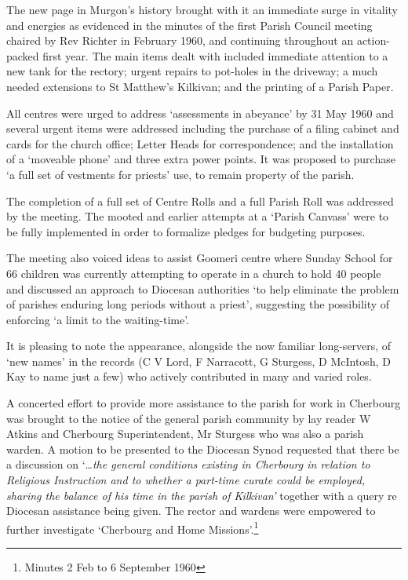 The new page in Murgon's history brought with it an immediate surge in vitality and energies as evidenced in the minutes of the first Parish Council meeting chaired by Rev Richter in February 1960, and continuing throughout an action-packed first year. The main items dealt with included immediate attention to a new tank for the rectory; urgent repairs to pot-holes in the driveway; a much needed extensions to St Matthew's Kilkivan; and the printing of a Parish Paper.

All centres were urged to address `assessments in abeyance' by 31 May 1960 and several urgent items were addressed including the purchase of a filing cabinet and cards for the church office; Letter Heads for correspondence; and the installation of a `moveable phone' and three extra power points. It was proposed to purchase `a full set of vestments for priests' use, to remain property of the parish.

The completion of a full set of Centre Rolls and a full Parish Roll was addressed by the meeting. The mooted and earlier attempts at a `Parish Canvass' were to be fully implemented in order to formalize pledges for budgeting purposes.

The meeting also voiced ideas to assist Goomeri centre where Sunday School for 66 children was currently attempting to operate in a church to hold 40 people and discussed an approach to Diocesan authorities `to help eliminate the problem of parishes enduring long periods without a priest', suggesting the possibility of enforcing `a limit to the waiting-time'.

It is pleasing to note the appearance, alongside the now familiar long-servers, of `new names' in the records (C V Lord, F Narracott, G Sturgess, D McIntosh, D Kay to name just a few) who actively contributed in many and varied roles.

A concerted effort to provide more assistance to the parish for work in Cherbourg was brought to the notice of the general parish community by lay reader W Atkins and Cherbourg Superintendent, Mr Sturgess who was also a parish warden. A motion to be presented to the Diocesan Synod requested that there be a discussion on `\ldots{}\emph{the general conditions existing in Cherbourg in relation to Religious Instruction and to whether a part-time curate could be employed, sharing the balance of his time in the parish of Kilkivan'} together with a query re Diocesan assistance being given. The rector and wardens were empowered to further investigate `Cherbourg and Home Missions'.\footnote{Minutes 2 Feb to 6 September 1960}

